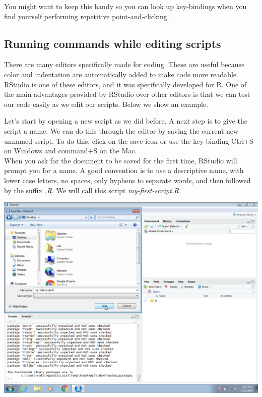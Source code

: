 \documentclass[
]{krantz}
\begin{document}
You might want to keep this handy so you can look up key-bindings when you find yourself performing repetitive point-and-clicking.

\hypertarget{running-commands-while-editing-scripts}{%
\subsection{Running commands while editing scripts}\label{running-commands-while-editing-scripts}}

There are many editors specifically made for coding. These are useful because color and indentation are automatically added to make code more readable. RStudio is one of these editors, and it was specifically developed for R. One of the main advantages provided by RStudio over other editors is that we can test our code easily as we edit our scripts. Below we show an example.

Let's start by opening a new script as we did before. A next step is to give the script a name. We can do this through the editor by saving the current new unnamed script. To do this, click on the save icon or use the key binding Ctrl+S on Windows and command+S on the Mac.\\

When you ask for the document to be saved for the first time, RStudio will prompt you for a name. A good convention is to use a descriptive name, with lower case letters, no spaces, only hyphens to separate words, and then followed by the suffix \emph{.R}. We will call this script \emph{my-first-script.R}.

\begin{center}\includegraphics[width=0.7\linewidth]{productivity/img/windows-screenshots/VirtualBox_Windows-7-Enterprise_22_03_2018_16_27_44} \end{center}
\end{document}
